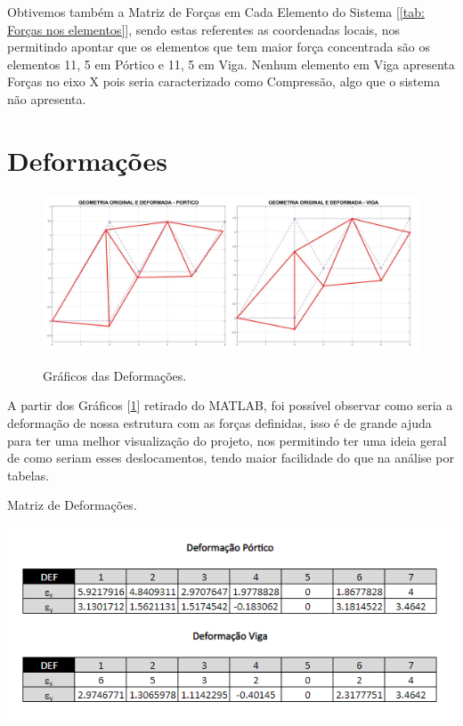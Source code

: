\documentclass[deposito, acronym, symbols]{fei}
\begin{document}
Obtivemos também a Matriz de Forças em Cada Elemento do Sistema [\ref{tab: Forças nos elementos}], sendo estas referentes as coordenadas locais, nos permitindo apontar que os elementos que tem maior força concentrada são os elementos 11, 5  em Pórtico e 11, 5 em Viga. Nenhum elemento em Viga  apresenta Forças no eixo X pois seria caracterizado como Compressão, algo que o sistema não apresenta.

\section{Deformações}

\begin{figure}[!ht]
 \centering
    \caption{Gráficos das Deformações.}
    \includegraphics[width=1\linewidth]{Imagens/DeformaçãoTotal.png}
    \label{fig: Deformação}
 \end{figure}

A partir dos Gráficos [\ref{fig: Deformação}] retirado do MATLAB, foi possível observar como seria a deformação de nossa estrutura com as forças definidas, isso é de grande ajuda para ter uma melhor visualização do projeto, nos permitindo ter uma ideia geral de como seriam esses deslocamentos, tendo maior facilidade do que na análise por tabelas.
 
\begin{table}[!htb]
 \centering
    \caption{Matriz de Deformações.}
    \includegraphics[width=1\linewidth]{Tabelas/TabelaDeformações.png}
    \label{tab: Deformormação}
 \end{table}
\end{document}
